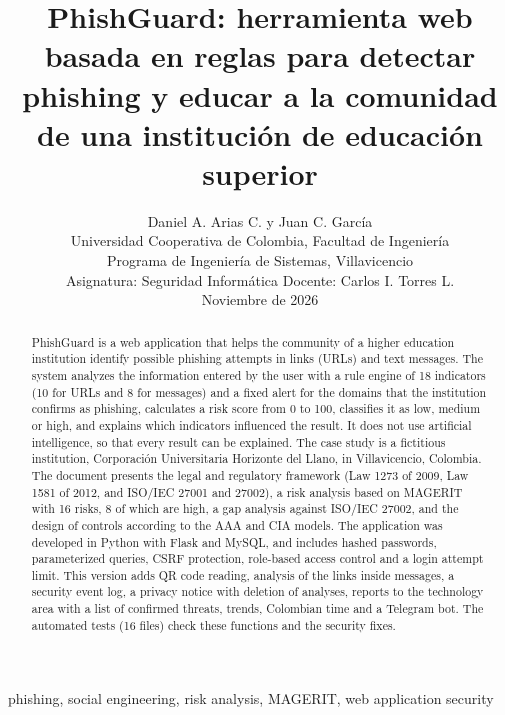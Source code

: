 \documentclass[journal,onecolumn,12pt,draftclsnofoot]{IEEEtran}
\begin{document}
\title{PhishGuard: herramienta web basada en reglas para detectar phishing y educar a la comunidad de una institución de educación superior}

\author{Daniel A. Arias C. y Juan C. García\\
Universidad Cooperativa de Colombia, Facultad de Ingeniería\\
Programa de Ingeniería de Sistemas, Villavicencio\\
Asignatura: Seguridad Informática \textperiodcentered{} Docente: Carlos I. Torres L.\\
Noviembre de 2026}

\maketitle

\begin{abstract}
PhishGuard is a web application that helps the community of a higher education institution identify possible phishing attempts in links (URLs) and text messages. The system analyzes the information entered by the user with a rule engine of 18 indicators (10 for URLs and 8 for messages) and a fixed alert for the domains that the institution confirms as phishing, calculates a risk score from 0 to 100, classifies it as low, medium or high, and explains which indicators influenced the result. It does not use artificial intelligence, so that every result can be explained. The case study is a fictitious institution, Corporación Universitaria Horizonte del Llano, in Villavicencio, Colombia. The document presents the legal and regulatory framework (Law 1273 of 2009, Law 1581 of 2012, and ISO/IEC 27001 and 27002), a risk analysis based on MAGERIT with 16 risks, 8 of which are high, a gap analysis against ISO/IEC 27002, and the design of controls according to the AAA and CIA models. The application was developed in Python with Flask and MySQL, and includes hashed passwords, parameterized queries, CSRF protection, role-based access control and a login attempt limit. This version adds QR code reading, analysis of the links inside messages, a security event log, a privacy notice with deletion of analyses, reports to the technology area with a list of confirmed threats, trends, Colombian time and a Telegram bot. The automated tests (16 files) check these functions and the security fixes.
\end{abstract}

\begin{IEEEkeywords}
phishing, social engineering, risk analysis, MAGERIT, web application security
\end{IEEEkeywords}
\end{document}
